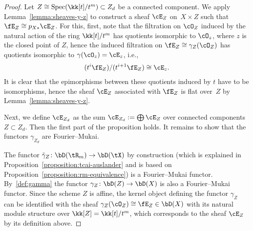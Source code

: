 \documentclass[11pt]{amsart}
\DeclareMathOperator{\End}{\mathrm{End}}
\DeclareMathOperator{\Spec}{\mathrm{Spec}}
\theoremstyle{plain}
\theoremstyle{definition}
\theoremstyle{remark}
\begin{document}
\begin{proof}
Let $Z \cong \Spec(\kk[t]/t^m) \subset Z_d$ be a connected component.
We apply Lemma~\ref{lemma:sheaves-y-z} to construct a sheaf $\cE_Z$ on~$X \times Z$ such that $\fE_Z \cong p_{X*}\cE_Z$.
For this, first, note that the filtration on $\cO_Z$ induced by the natural action of the ring $\kk[t]/t^m$ 
has quotients isomorphic to $\cO_z$, where $z$ is the closed point of $Z$,
hence the induced filtration on $\fE_Z \cong \gamma_Z(\cO_Z)$ has quotients isomorphic to $\gamma(\cO_z) = \cE_z$, i.e., 
\begin{equation}\label{eq:fez-quotients}
(t^i\fE_Z)/(t^{i+1}\fE_Z) \cong \cE_z.
\end{equation}
It is clear that the epimorphisms between these quotients induced by $t$ have to be isomorphisms,
hence the sheaf $\cE_Z$ associated with $\fE_Z$ is flat over~$Z$ by Lemma~\ref{lemma:sheaves-y-z}.


Next, we define $\cE_{Z_d}$ as the sum $\cE_{Z_d} := \bigoplus \cE_Z$ over connected components $Z \subset Z_d$.
Then the first part of the proposition holds.
It remains to show that the functors $\gamma_{Z_d}$ are Fourier--Mukai.


The functor $\tilde\gamma_Z \colon \bD(\tR_m) \to \bD(\tX)$ by construction 
(which is explained in Proposition~\ref{proposition:tcai-auslander} and is based on Proposition~\ref{proposition:rm-equivalence}) 
is a Fourier--Mukai functor.
By~\eqref{def:gamma} the functor $\gamma_Z \colon \bD(Z) \to \bD(X)$ is also a Fourier--Mukai functor.
Since the scheme $Z$ is affine, the kernel object defining the functor $\gamma_Z$ can be identified with the sheaf  $\gamma_Z(\cO_Z) \cong \fE_Z \in \bD(X)$ with its natural module structure over $\kk[Z] = \kk[t]/t^m$, 
which corresponds to the sheaf $\cE_Z$ by its definition above.



\end{proof}
\end{document}
